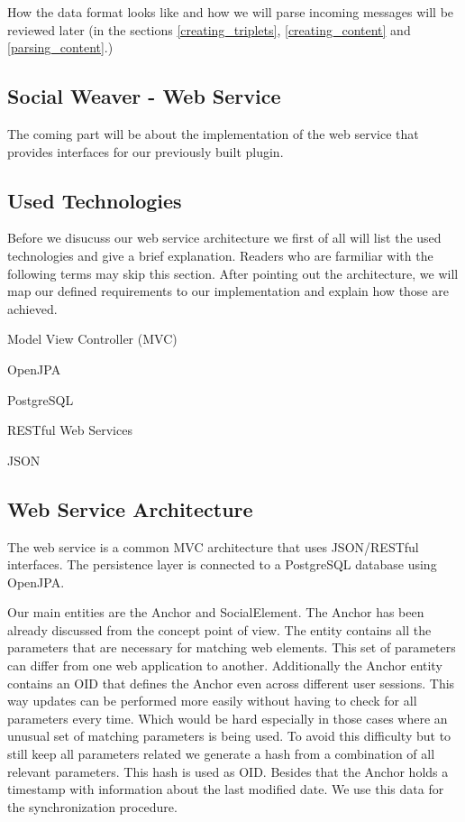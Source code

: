 How the data format looks like and how we will parse incoming messages will be reviewed later (in the sections \ref{creating_triplets}, \ref{creating_content} and \ref{parsing_content}.)

\subsection{Social Weaver - Web Service}
The coming part will be about the implementation of the web service that provides interfaces for our previously built plugin.

\subsection{Used Technologies}
Before we disucuss our web service architecture we first of all will list the used technologies and give a brief explanation. Readers who are farmiliar with the following terms may skip this section. 
After pointing out the architecture, we will map our defined requirements to our implementation and explain how those are achieved.

\begin{description}
	\item Model View Controller (MVC)
	\item OpenJPA
	\item PostgreSQL
	\item RESTful Web Services
	\item JSON
\end{description}

\subsection{Web Service Architecture}
The web service is a common MVC architecture that uses JSON/RESTful interfaces. The persistence layer is connected to a PostgreSQL database using OpenJPA. 

Our main entities are the Anchor and SocialElement. The Anchor has been already discussed from the concept point of view. The entity contains all the parameters that are necessary for matching web elements. This set of parameters can differ from one web application to another. Additionally the Anchor entity contains an OID that defines the Anchor even across different user sessions. This way updates can be performed more easily without having to check for all parameters every time. Which would be hard especially in those cases where an unusual set of matching parameters is being used. To avoid this difficulty but to still keep all parameters related we generate a hash from a combination of all relevant parameters. This hash is used as OID. 
Besides that the Anchor holds a timestamp with information about the last modified date. We use this data for the synchronization procedure. 

